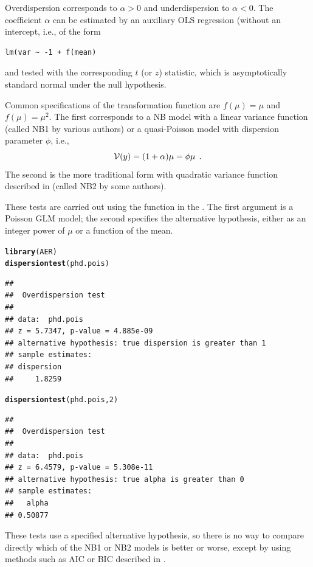 \documentclass[11pt]{book}\usepackage[]{graphicx}\usepackage[]{color}
\makeatletter
\newcommand{\hlnum}[1]{\textcolor[rgb]{0.686,0.059,0.569}{#1}}%
\newcommand{\hlstd}[1]{\textcolor[rgb]{0.345,0.345,0.345}{#1}}%
\newcommand{\hlkwd}[1]{\textcolor[rgb]{0.737,0.353,0.396}{\textbf{#1}}}%
\newenvironment{kframe}{%
 \def\at@end@of@kframe{}%
 \ifinner\ifhmode%
  \def\at@end@of@kframe{\end{minipage}}%
  \begin{minipage}{\columnwidth}%
 \fi\fi%
 \def\FrameCommand##1{\hskip\@totalleftmargin \hskip-\fboxsep
 \colorbox{shadecolor}{##1}\hskip-\fboxsep
     \hskip-\linewidth \hskip-\@totalleftmargin \hskip\columnwidth}%
 \MakeFramed {\advance\hsize-\width
   \@totalleftmargin\z@ \linewidth\hsize
   \@setminipage}}%
 {\par\unskip\endMakeFramed%
 \at@end@of@kframe}
\newenvironment{knitrout}{}{} %
\renewenvironment{knitrout}{\small\renewcommand{\baselinestretch}{.85}}{} %
\makeatother
\begin{document}
Overdispersion corresponds to $\alpha > 0$ and underdispersion to $\alpha < 0$.
The coefficient $\alpha$ can be estimated by an auxiliary OLS regression (without an intercept, i.e., of the
form
\begin{verbatim}
lm(var ~ -1 + f(mean)
\end{verbatim}
and tested with the corresponding $t$ (or $z$) statistic, which is asymptotically standard normal under the null hypothesis.

Common specifications of the transformation function are  $f(\mu) = \mu$ and $f(\mu) = \mu^2$. The first corresponds to
a NB model with a linear variance function (called NB1 by various authors)
or a quasi-Poisson model with dispersion parameter $\phi$, i.e.,
\begin{equation*}
\mathcal{V}(y) = (1 + \alpha) \mu = \phi \mu \:\: .
\end{equation*}
The second is the more traditional form with quadratic variance function described in 
(called NB2 by some authors).

These tests are carried out using the  function in the .
The first argument is a Poisson GLM model; the second specifies the alternative hypothesis,
either as an integer power of $\mu$ or a function of the mean.
\begin{knitrout}
\color{fgcolor}\begin{kframe}
\begin{alltt}
\hlkwd{library}\hlstd{(AER)}
\hlkwd{dispersiontest}\hlstd{(phd.pois)}
\end{alltt}
\begin{verbatim}
## 
## 	Overdispersion test
## 
## data:  phd.pois
## z = 5.7347, p-value = 4.885e-09
## alternative hypothesis: true dispersion is greater than 1
## sample estimates:
## dispersion 
##     1.8259
\end{verbatim}
\begin{alltt}
\hlkwd{dispersiontest}\hlstd{(phd.pois,} \hlnum{2}\hlstd{)}
\end{alltt}
\begin{verbatim}
## 
## 	Overdispersion test
## 
## data:  phd.pois
## z = 6.4579, p-value = 5.308e-11
## alternative hypothesis: true alpha is greater than 0
## sample estimates:
##   alpha 
## 0.50877
\end{verbatim}
\end{kframe}
\end{knitrout}
These tests use a specified alternative hypothesis, so there is no way to compare directly which of
the NB1 or NB2 models is better or worse, except by using methods such as
AIC or BIC described in .
\end{document}
